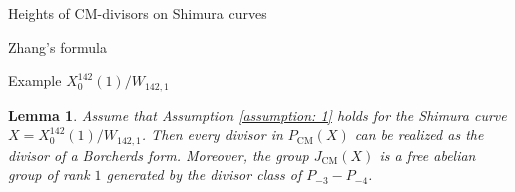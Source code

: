 \documentclass{amsart}
\newcounter{lemma}
\newtheorem{Lemma}[lemma]{Lemma}
\theoremstyle{definition}
\newtheorem{Assumption}[lemma]{Assumption}
\def\CM{\mathrm{CM}}
\def\Pic{\operatorname{Pic}}
\begin{document}
\begin{section}{Heights of CM-divisors on Shimura curves}
\begin{subsection}{Zhang's formula}



\end{subsection}

\begin{subsection}{Example $X_0^{142}(1)/W_{142,1}$}

\begin{Lemma} 
  Assume that Assumption \ref{assumption: 1} holds for the Shimura
  curve $X=X_0^{142}(1)/W_{142,1}$. Then every divisor in
  $P_\CM(X)$ can be realized as the divisor of a Borcherds form.
  Moreover, the group $J_\CM(X)$ is a free abelian group of rank $1$
  generated by the divisor class of $P_{-3}-P_{-4}$.
\end{Lemma}


\end{subsection}
\end{section}
\end{document}
